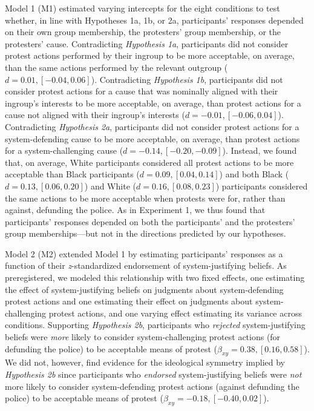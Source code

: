 \documentclass[twocolumn, 11pt, letterpaper]{article}
\begin{document}
Model 1 (M1) estimated varying intercepts for the eight conditions to
test whether, in line with Hypotheses 1a, 1b, or 2a, participants'
responses depended on their own group membership, the protesters' group
membership, or the protesters' cause. Contradicting \emph{Hypothesis
1a}, participants did not consider protest actions performed by their
ingroup to be more acceptable, on average, than the same actions
performed by the relevant outgroup (\(d = 0.01, [-0.04, 0.06]\)).
Contradicting \emph{Hypothesis 1b}, participants did not consider
protest actions for a cause that was nominally aligned with their
ingroup's interests to be more acceptable, on average, than protest
actions for a cause not aligned with their ingroup's interests
(\(d = -0.01, [-0.06, 0.04]\)). Contradicting \emph{Hypothesis 2a},
participants did not consider protest actions for a system-defending
cause to be more acceptable, on average, than protest actions for a
system-challenging cause (\(d = -0.14, [-0.20, -0.09]\)). Instead, we
found that, on average, White participants considered all protest
actions to be more acceptable than Black participants
(\(d = 0.09, [0.04, 0.14]\)) and both Black (\(d = 0.13, [0.06, 0.20]\))
and White (\(d = 0.16, [0.08, 0.23]\)) participants considered the same
actions to be more acceptable when protests were for, rather than
against, defunding the police. As in Experiment 1, we thus found that
participants' responses depended on both the participants' and the
protesters' group memberships---but not in the directions predicted by
our hypotheses.

Model 2 (M2) extended Model 1 by estimating participants' responses as a
function of their \emph{z}-standardized endorsement of system-justifying
beliefs. As preregistered, we modeled this relationship with two fixed
effects, one estimating the effect of system-justifying beliefs on
judgments about system-defending protest actions and one estimating
their effect on judgments about system-challenging protest actions, and
one varying effect estimating its variance across conditions. Supporting
\emph{Hypothesis 2b}, participants who \emph{rejected} system-justifying
beliefs were \emph{more} likely to consider system-challenging protest
actions (for defunding the police) to be acceptable means of protest
(\(\beta_{xy} = 0.38, [0.16, 0.58]\)). We did not, however, find
evidence for the ideological symmetry implied by \emph{Hypothesis 2b}
since participants who \emph{endorsed} system-justifying beliefs were
\emph{not} more likely to consider system-defending protest actions
(against defunding the police) to be acceptable means of protest
(\(\beta_{xy} = -0.18, [-0.40, 0.02]\)).
\end{document}
